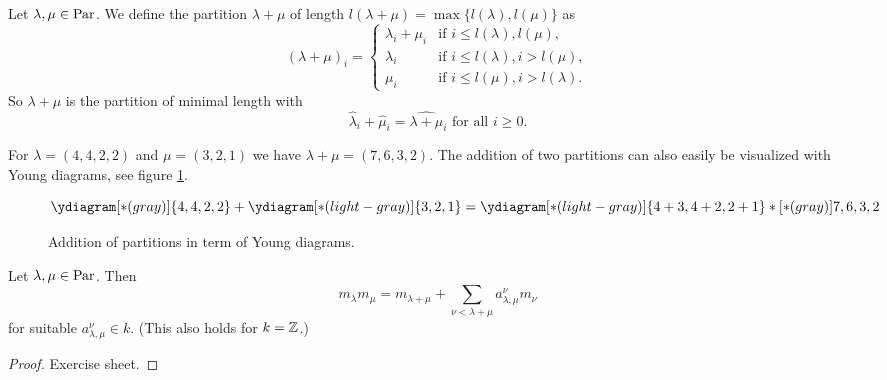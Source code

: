 \begin{defi}
 Let $\lambda, \mu \in \operatorname{Par}$. We define the partition $\lambda+\mu$ of length $l(\lambda+\mu) = \max\{ l(\lambda), l(\mu) \}$ as
 \[
  (\lambda+\mu)_i =
  \begin{cases}
   \lambda_i + \mu_i & \text{if } i \leq l(\lambda),l(\mu), \\
   \lambda_i         & \text{if } i \leq l(\lambda), i > l(\mu), \\
   \mu_i             & \text{if } i \leq l(\mu), i > l(\lambda).
  \end{cases}
 \]
 So $\lambda+\mu$ is the partition of minimal length with
 \[
  \hat{\lambda}_i + \hat{\mu}_i = \widehat{\lambda+\mu}_i \text{ for all } i \geq 0.
 \]
\end{defi}


\begin{expl}
 For $\lambda = (4,4,2,2)$ and $\mu = (3,2,1)$ we have $\lambda+\mu = (7,6,3,2)$. The addition of two partitions can also easily be visualized with Young diagrams, see figure \ref{fig: addition partition young diagrams}.
 \begin{figure}\centering
  \[
   \ydiagram[*(gray)]{4,4,2,2} + \ydiagram[*(light-gray)]{3,2,1}
   = \ydiagram[*(light-gray)] {4+3,4+2,2+1} *[*(gray)]{7,6,3,2}
  \]
  \caption{Addition of partitions in term of Young diagrams.}
  \label{fig: addition partition young diagrams}
 \end{figure}
\end{expl}


\begin{lem}
 Let $\lambda, \mu \in \operatorname{Par}$. Then
 \[
  m_{\lambda} m_{\mu} = m_{\lambda + \mu} + \sum_{\nu < \lambda + \mu} a^\nu_{\lambda,\mu} m_\nu
 \]
 for suitable $a^\nu_{\lambda,\mu} \in k$. (This also holds for $k = \mathbb{Z}$.)
\end{lem}
\begin{proof}
 Exercise sheet.
\end{proof}

